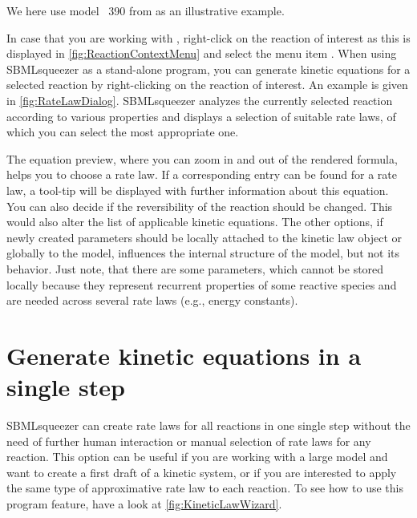We here use model \numero~390 from \BioModels \citep{Li2010a, Arnold2011} as an illustrative example.

In case that you are working with \CellDesigner \citep{Funahashi2003, Funahashi2006, Funahashi2007a, Funahashi2008}, right-click on the reaction of interest as this is displayed in \vref{fig:ReactionContextMenu} and select the menu item .
When using SBMLsqueezer as a stand-alone program, you can generate kinetic equations for a selected reaction by right-clicking on the reaction of interest.
An example is given in \vref{fig:RateLawDialog}.
SBMLsqueezer analyzes the currently selected reaction according to various properties
and displays a selection of suitable rate laws, of which you can select
the most appropriate one.

The equation preview, where you can zoom in and out of the rendered formula, helps you to choose a rate law. If a corresponding \SBO entry can be found for a rate law, a tool-tip will be displayed with further information about this equation.
You can also decide if the reversibility of the reaction should be changed.
This would also alter the list of applicable kinetic equations.
The other options, if newly created
parameters should be locally attached to the kinetic law object or globally to
the model, influences the internal structure of the model, but not its behavior.
Just note, that there are some parameters, which cannot be stored locally because
they represent recurrent properties of some reactive species and are needed
across several rate laws (e.g., energy constants).

\section{Generate kinetic equations in a single step}

SBMLsqueezer can create rate laws for all reactions in one single step without the need of further human interaction or manual selection of rate laws for any reaction.
This option can %
be %
useful if you are working with a large model and want to create a first draft of a kinetic system, or if you are interested to apply the same type of approximative rate law to each reaction.
To see how to use this program feature, have a look at \vref{fig:KineticLawWizard}.

